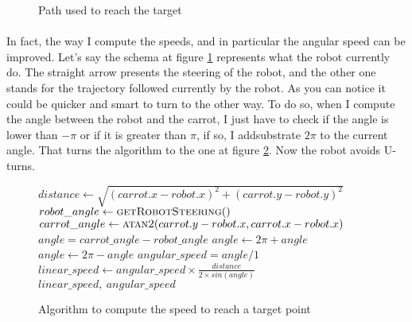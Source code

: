 \begin{figure}[!h]
    \begin{center}
        
    \end{center}
    
    \caption{
        \label{fig:path}
        Path used to reach the target
    }
\end{figure}

\paragraph{}{
    In fact, the way I compute the speeds, and in particular the angular speed
can be improved. Let's say the schema at figure \ref{fig:path} represents what
the robot currently do. The straight arrow presents the steering of the
robot, and the other one stands for the trajectory followed currently by the
robot. As you can notice it could be quicker and smart to turn to the other 
way. To do so, when I compute the angle between the robot and the carrot, I
just have to check if the angle is lower than $-\pi$ or if it is greater than $\pi$, if so, I add\/substrate $2\pi$ to the current angle. That turns the
algorithm to the one at figure \ref{algo:speeds_smart}. Now the robot avoids 
U-turns.
}

\begin{figure}[!h]
    \begin{algorithmic}
        \State $distance \gets \sqrt{(carrot.x - robot.x)^{2} + (carrot.y - robot.y)^{2}}$
        \State $robot\_angle \gets \Call{getRobotSteering}$
        \State $carrot\_angle \gets \Call{atan2}{carrot.y - robot.x, carrot.x - robot.x}$
        \State $angle = carrot\_angle - robot\_angle$
            \State $ angle \gets 2\pi + angle $
        \EndIf
            \State $ angle \gets 2\pi - angle $
        \EndIf
        \State $angular\_speed = angle / 1$
        \State $linear\_speed \gets angular\_speed \times \frac{distance}{2 \times sin( angle )} $
        \State \Return $linear\_speed,~angular\_speed$
     \EndFunction
    \end{algorithmic}
    
    \caption{
        \label{algo:speeds_smart}
        Algorithm to compute the speed to reach a target point
    }
\end{figure}

\paragraph{}{
}

